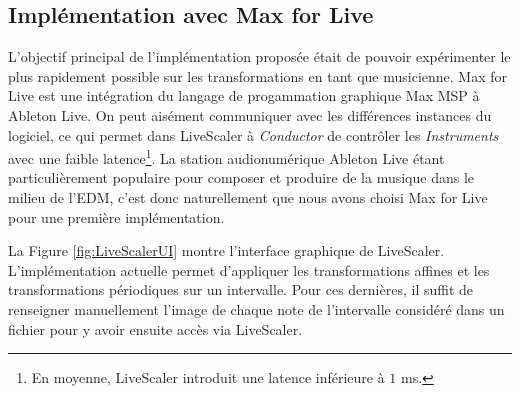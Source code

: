 \subsection{Implémentation avec Max for Live}

L'objectif principal de l'implémentation proposée était de pouvoir expérimenter le plus rapidement possible sur les transformations en tant que musicienne. Max for Live est une intégration du  langage de progammation graphique Max MSP à Ableton Live. On peut aisément communiquer avec les différences instances du logiciel, ce qui permet dans LiveScaler à \emph{Conductor} de contrôler les \emph{Instruments} avec une faible latence\footnote{En moyenne, LiveScaler introduit une latence inférieure à $1$ ms.}. La station audionumérique Ableton Live étant particulièrement populaire pour composer et produire de la musique dans le milieu de l'EDM, c'est donc naturellement que nous avons choisi Max for Live pour une première implémentation. 

La Figure \ref{fig:LiveScalerUI} montre l'interface graphique de LiveScaler. L'implémentation actuelle permet d'appliquer les transformations affines et les transformations périodiques sur un intervalle. Pour ces dernières, il suffit de renseigner manuellement l'image de chaque note de l'intervalle considéré dans un fichier pour y avoir ensuite accès via LiveScaler.







